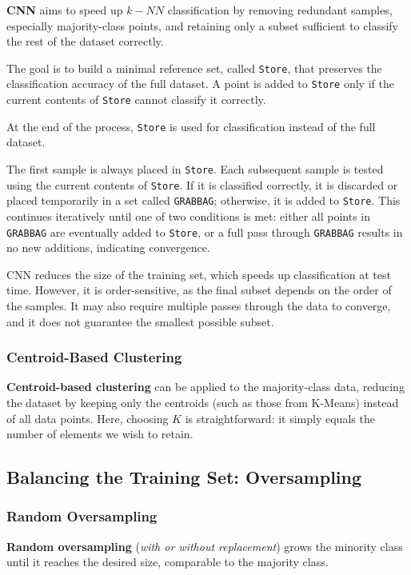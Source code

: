 \textbf{CNN} aims to speed up $k-NN$ classification by removing redundant samples, especially majority-class points, and retaining only a subset sufficient to classify the rest of the dataset correctly.

The goal is to build a minimal reference set, called \texttt{Store}, that preserves the classification accuracy of the full dataset. A point is added to \texttt{Store} only if the current contents of \texttt{Store} cannot classify it correctly.

At the end of the process, \texttt{Store} is used for classification instead of the full dataset.

The first sample is always placed in \texttt{Store}. Each subsequent sample is tested using the current contents of \texttt{Store}. If it is classified correctly, it is discarded or placed temporarily in a set called \texttt{GRABBAG}; otherwise, it is added to \texttt{Store}. This continues iteratively until one of two conditions is met: either all points in \texttt{GRABBAG} are eventually added to \texttt{Store}, or a full pass through \texttt{GRABBAG} results in no new additions, indicating convergence.

CNN reduces the size of the training set, which speeds up classification at test time. However, it is order-sensitive, as the final subset depends on the order of the samples. It may also require multiple passes through the data to converge, and it does not guarantee the smallest possible subset.

\subsubsection{Centroid-Based Clustering}
\textbf{Centroid-based clustering} can be applied to the majority-class data, reducing the dataset by keeping only the centroids (such as those from K-Means) instead of all data points. Here, choosing $K$ is straightforward: it simply equals the number of elements we wish to retain.

\subsection{Balancing the Training Set: Oversampling}
\subsubsection{Random Oversampling}
\textbf{Random oversampling} (\textit{with or without replacement}) grows the minority class until it reaches the desired size, comparable to the majority class.

